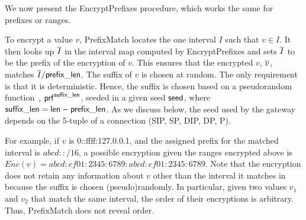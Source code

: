 We now present the EncryptPrefixes procedure, which works the same for prefixes or ranges.



\begin{framed}
\end{framed}

To encrypt a value $v$, PrefixMatch locates the one interval $I$ such that $v \in I$. It then looks up $\overline{I}$ in the interval map computed by EncryptPrefixes and sets $\overline{I}$ to be the prefix of the encryption of $v$. This ensures that the encrypted $v$, $\overline{v}$, matches $\overline{I}/\mathsf{prefix\_len}$. The suffix of $v$ is chosen at random. The only requirement is that it is deterministic. 
Hence, the suffix is chosen based on a pseudorandom function~\cite{goldreichvolume1}, $\mathsf{prf}^{\mathsf{suffix\_len}}$, seeded in a given seed  $\mathsf{seed}$, where $\mathsf{suffix\_len} = \mathsf{len}-\mathsf{prefix\_len}$.  As we discuss below, the seed used by the gateway depends on the 5-tuple of a connection (SIP, SP, DIP, DP, P).



For example, if $v$ is 0::ffff:127.0.0.1, and the assigned prefix for the matched interval is $abcd::/16$, a possible encryption given the ranges encrypted above is $Enc(v) = abcd:ef01:2345:6789:abcd:ef01:2345:6789$. Note that the encryption does not retain any information about $v$ other than the interval it matches in because the suffix is chosen (pseudo)randomly. In particular, given two values $v_1$ and $v_2$ that match the same interval, the order of their encryptions is arbitrary. Thus, PrefixMatch does not reveal order.

